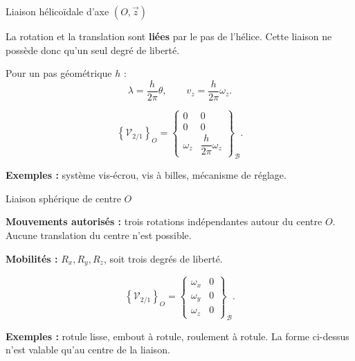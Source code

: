 \begin{TLLiaisonCard}{Liaison hélicoïdale d'axe \((O,\vec z)\)}
\begin{minipage}[c]{.18\linewidth}\centering
\TLSymHelicoidale
\end{minipage}\hfill
\begin{minipage}[c]{.77\linewidth}
La rotation et la translation sont \textbf{liées} par le pas de l'hélice.
Cette liaison ne possède donc qu'un seul degré de liberté.

Pour un pas géométrique \(h\) :
\[
\lambda=\frac{h}{2\pi}\theta,
\qquad
v_z=\frac{h}{2\pi}\omega_z.
\]

\[
\left\{\mathcal V_{2/1}\right\}_O=
\left\{\begin{array}{cc}
0&0\\0&0\\\omega_z&\dfrac{h}{2\pi}\omega_z
\end{array}\right\}_{\mathcal B}.
\]

\textbf{Exemples :} système vis-écrou, vis à billes, mécanisme de réglage.
\end{minipage}
\end{TLLiaisonCard}

\begin{TLLiaisonCard}{Liaison sphérique de centre \(O\)}
\begin{minipage}[c]{.18\linewidth}\centering
\TLSymSpherique
\end{minipage}\hfill
\begin{minipage}[c]{.77\linewidth}
\textbf{Mouvements autorisés :} trois rotations indépendantes autour du centre
\(O\). Aucune translation du centre n'est possible.

\textbf{Mobilités :} \(R_x,R_y,R_z\), soit trois degrés de liberté.

\[
\left\{\mathcal V_{2/1}\right\}_O=
\left\{\begin{array}{cc}
\omega_x&0\\\omega_y&0\\\omega_z&0
\end{array}\right\}_{\mathcal B}.
\]

\textbf{Exemples :} rotule lisse, embout à rotule, roulement à rotule.
La forme ci-dessus n'est valable qu'au centre de la liaison.
\end{minipage}
\end{TLLiaisonCard}


